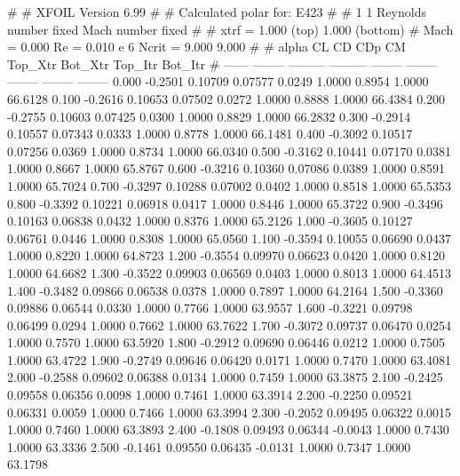 #  
#       XFOIL         Version 6.99
#  
# Calculated polar for: E423                                            
#  
# 1 1 Reynolds number fixed          Mach number fixed         
#  
# xtrf =   1.000 (top)        1.000 (bottom)  
# Mach =   0.000     Re =     0.010 e 6     Ncrit =   9.000  9.000
#  
#   alpha    CL        CD       CDp       CM     Top_Xtr  Bot_Xtr  Top_Itr  Bot_Itr
#  ------ -------- --------- --------- -------- -------- -------- -------- --------
   0.000  -0.2501   0.10709   0.07577   0.0249   1.0000   0.8954   1.0000  66.6128
   0.100  -0.2616   0.10653   0.07502   0.0272   1.0000   0.8888   1.0000  66.4384
   0.200  -0.2755   0.10603   0.07425   0.0300   1.0000   0.8829   1.0000  66.2832
   0.300  -0.2914   0.10557   0.07343   0.0333   1.0000   0.8778   1.0000  66.1481
   0.400  -0.3092   0.10517   0.07256   0.0369   1.0000   0.8734   1.0000  66.0340
   0.500  -0.3162   0.10441   0.07170   0.0381   1.0000   0.8667   1.0000  65.8767
   0.600  -0.3216   0.10360   0.07086   0.0389   1.0000   0.8591   1.0000  65.7024
   0.700  -0.3297   0.10288   0.07002   0.0402   1.0000   0.8518   1.0000  65.5353
   0.800  -0.3392   0.10221   0.06918   0.0417   1.0000   0.8446   1.0000  65.3722
   0.900  -0.3496   0.10163   0.06838   0.0432   1.0000   0.8376   1.0000  65.2126
   1.000  -0.3605   0.10127   0.06761   0.0446   1.0000   0.8308   1.0000  65.0560
   1.100  -0.3594   0.10055   0.06690   0.0437   1.0000   0.8220   1.0000  64.8723
   1.200  -0.3554   0.09970   0.06623   0.0420   1.0000   0.8120   1.0000  64.6682
   1.300  -0.3522   0.09903   0.06569   0.0403   1.0000   0.8013   1.0000  64.4513
   1.400  -0.3482   0.09866   0.06538   0.0378   1.0000   0.7897   1.0000  64.2164
   1.500  -0.3360   0.09886   0.06544   0.0330   1.0000   0.7766   1.0000  63.9557
   1.600  -0.3221   0.09798   0.06499   0.0294   1.0000   0.7662   1.0000  63.7622
   1.700  -0.3072   0.09737   0.06470   0.0254   1.0000   0.7570   1.0000  63.5920
   1.800  -0.2912   0.09690   0.06446   0.0212   1.0000   0.7505   1.0000  63.4722
   1.900  -0.2749   0.09646   0.06420   0.0171   1.0000   0.7470   1.0000  63.4081
   2.000  -0.2588   0.09602   0.06388   0.0134   1.0000   0.7459   1.0000  63.3875
   2.100  -0.2425   0.09558   0.06356   0.0098   1.0000   0.7461   1.0000  63.3914
   2.200  -0.2250   0.09521   0.06331   0.0059   1.0000   0.7466   1.0000  63.3994
   2.300  -0.2052   0.09495   0.06322   0.0015   1.0000   0.7460   1.0000  63.3893
   2.400  -0.1808   0.09493   0.06344  -0.0043   1.0000   0.7430   1.0000  63.3336
   2.500  -0.1461   0.09550   0.06435  -0.0131   1.0000   0.7347   1.0000  63.1798
